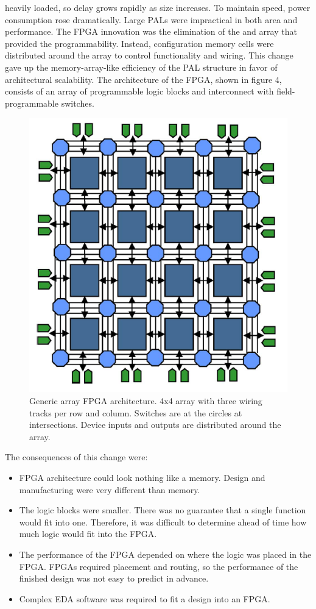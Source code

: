 heavily loaded, so delay grows rapidly as size increases. To maintain speed, power consumption rose dramatically. Large PALs were
impractical in both area and performance.
\newline
The FPGA innovation was the elimination of the and array that provided the programmability. Instead, configuration
memory cells were distributed around the array to control functionality and wiring. This change gave up the
memory-array-like efficiency of the PAL structure in favor of architectural scalability. The architecture of the FPGA,
shown in figure 4, consists of an array of programmable logic blocks and interconnect with field-programmable switches.
\begin{figure}[H]
	\centering
	\includegraphics[width=0.7\linewidth]{IMG/ch3/FPGA}
	\caption{Generic array FPGA architecture. 4x4 array with three wiring
		tracks per row and column. Switches are at the circles at intersections.
		Device inputs and outputs are distributed around the array.}
	\label{fig:fpga}
\end{figure}
\noindent The consequences of this change were:
\begin{itemize}
	\item FPGA architecture could look nothing like a memory. Design and manufacturing were very different than memory.
	\item The logic blocks were smaller. There was no guarantee that a single function would fit into one. Therefore, it was difficult to determine ahead of time how much logic would fit into the FPGA.
	\item The performance of the FPGA depended on where the logic was placed in the FPGA. FPGAs required placement and routing, so the performance of the finished design was not easy to predict in advance.
	\item Complex EDA software was required to fit a design into an FPGA.
\end{itemize}





